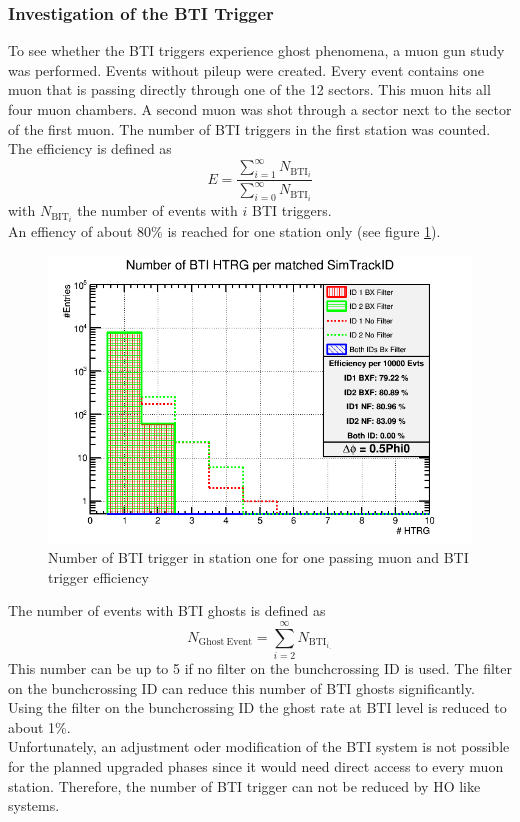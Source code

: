 \subsubsection{Investigation of the BTI Trigger}
To see whether the BTI triggers experience ghost phenomena, a muon gun study was performed. Events without pileup were created. Every event contains one muon that is passing directly through one of the 12 sectors. This muon hits all four muon chambers. A second muon was shot through a sector next to the sector of the first muon. The number of BTI triggers in the first station was counted.\\
The efficiency is defined as
\begin{equation}
E=\frac{\sum_{i = 1}^\infty N_{\mathrm{BTI}_i}}{\sum_{i = 0}^\infty N_{\mathrm{BTI}_i}}
\end{equation}
with $N_{\mathrm{BIT}_i}$ the number of events with $i$ BTI triggers.\\
An effiency of about 80\% is reached for one station only (see figure \ref{BTIEfficiency}).
\begin{figure}
\begin{minipage}[t]{0.95\textwidth}
\includegraphics[width=\textwidth]{Figures/scheuch/SectorGunPt100dPhi0_5Phi0_h1dFilteredBtiHitsPerEvtSL1.png}
\caption{Number of BTI trigger in station one for one passing muon and BTI trigger efficiency}
\label{BTIEfficiency}
\end{minipage}
\end{figure}
The number of events with BTI ghosts is defined as
\begin{equation}
N_{\mathrm{Ghost\ Event}} = \sum_{i = 2}^\infty N_{\mathrm{BTI}_i}_{\cdot}
\end{equation}
This number can be up to 5 if no filter on the bunchcrossing ID is used. The filter on the bunchcrossing ID can reduce this number of BTI ghosts significantly. Using the filter on the bunchcrossing ID the ghost rate at BTI level is reduced to about 1\%.\\
Unfortunately, an adjustment oder modification of the BTI system is not possible for the planned upgraded phases since it would need direct access to every muon station. Therefore, the number of BTI trigger can not be reduced by HO like systems.
